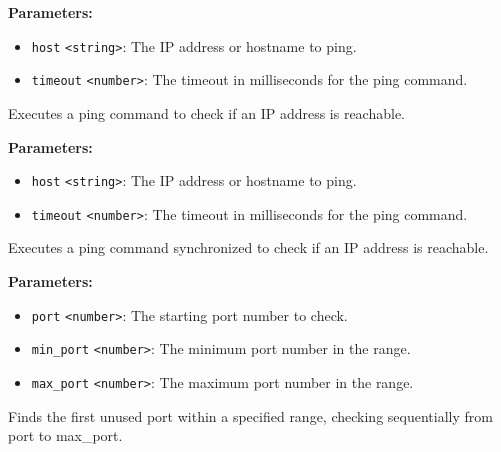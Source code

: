 \documentclass[12pt,a4paper]{article}
\begin{document}
\vspace{5mm}
\noindent {}


\noindent \textbf{Parameters:}
\begin{itemize}
  \item \texttt{host} \texttt{<string>}: The IP address or hostname to ping.
  \item \texttt{timeout} \texttt{<number>}: The timeout in milliseconds for the ping command.
\end{itemize}

\noindent Executes a ping command to check if an IP address is reachable.

\vspace{5mm}
\noindent {}


\noindent \textbf{Parameters:}
\begin{itemize}
  \item \texttt{host} \texttt{<string>}: The IP address or hostname to ping.
  \item \texttt{timeout} \texttt{<number>}: The timeout in milliseconds for the ping command.
\end{itemize}

\noindent Executes a ping command synchronized to check if an IP address is reachable.

\vspace{5mm}
\noindent {}


\noindent \textbf{Parameters:}
\begin{itemize}
  \item \texttt{port} \texttt{<number>}: The starting port number to check.
  \item \texttt{min\_port} \texttt{<number>}: The minimum port number in the range.
  \item \texttt{max\_port} \texttt{<number>}: The maximum port number in the range.
\end{itemize}

\noindent Finds the first unused port within a specified range, checking sequentially from \textasciigrave{}port\textasciigrave{} to \textasciigrave{}max\_port\textasciigrave{}.
\end{document}

